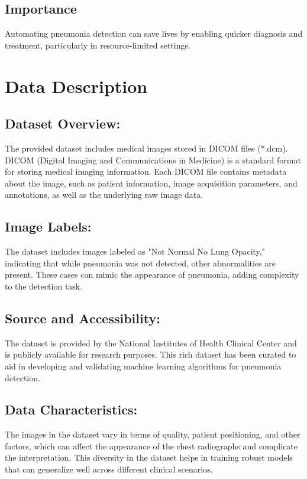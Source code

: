 \subsection{Importance}
\label{subsec:chap1 section 1.4}
Automating pneumonia detection can save lives by enabling quicker diagnosis and treatment, particularly in resource-limited settings.
\section{Data Description}
\label{sec:chap1 section 2}

\subsection{Dataset Overview:}
\label{subsec:chap1 section 2.1}

The provided dataset includes medical images stored in DICOM files (*.dcm). DICOM (Digital Imaging and Communications in Medicine) is a standard format for storing medical imaging information. Each DICOM file contains metadata about the image, such as patient information, image acquisition parameters, and annotations, as well as the underlying raw image data.

\subsection{Image Labels:}
\label{subsec:chap1 section 2.2}
The dataset includes images labeled as "Not Normal No Lung Opacity," indicating that while pneumonia was not detected, other abnormalities are present. These cases can mimic the appearance of pneumonia, adding complexity to the detection task.

\subsection{Source and Accessibility:}
\label{subsec:chap1 section 2.3}
The dataset is provided by the National Institutes of Health Clinical Center and is publicly available for research purposes. This rich dataset has been curated to aid in developing and validating machine learning algorithms for pneumonia detection.

\subsection{Data Characteristics:}
\label{subsec:chap1 section 2.4}
The images in the dataset vary in terms of quality, patient positioning, and other factors, which can affect the appearance of the chest radiographs and complicate the interpretation. This diversity in the dataset helps in training robust models that can generalize well across different clinical scenarios.

